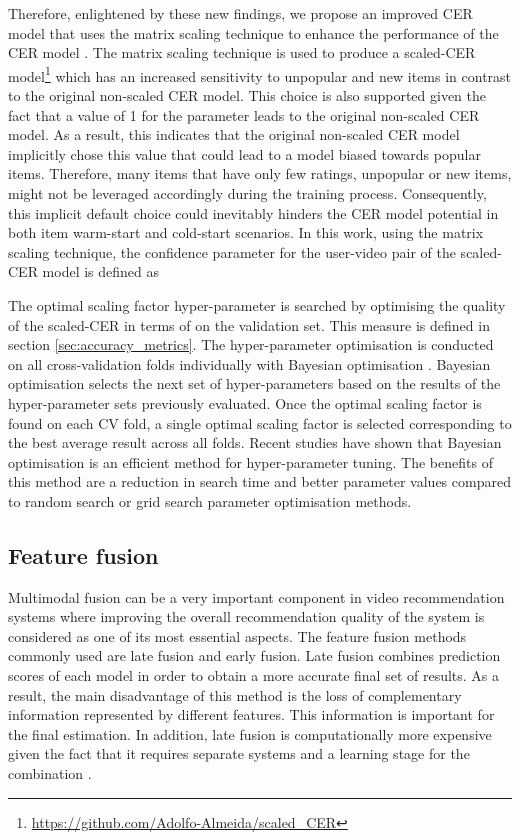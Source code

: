 \documentclass[review]{elsarticle}
\begin{document}
Therefore, enlightened by these new findings, we propose an improved CER model that uses the matrix scaling technique to enhance the performance of the CER model \citep{du2018personalized}. The matrix scaling technique is used to produce a scaled-CER model\footnote{\href{https://github.com/Adolfo-Almeida/scaled_CER}{https://github.com/Adolfo-Almeida/scaled\_CER}} which has an increased sensitivity to unpopular and new items in contrast to the original non-scaled CER model. This choice is also supported given the fact that a value of 1 for the parameter  leads to the original non-scaled CER model. As a result, this indicates that the original non-scaled CER model implicitly chose this value that could lead to a model biased towards popular items. Therefore, many items that have only few ratings, unpopular or new items, might not be leveraged accordingly during the training process. Consequently, this implicit default choice could inevitably hinders the CER model potential in both item warm-start and cold-start scenarios. In this work, using the matrix scaling technique, the confidence parameter  for the user-video pair  of the scaled-CER model is defined as 



The optimal scaling factor hyper-parameter  is searched by optimising the quality of the scaled-CER in terms of  on the validation set. This measure is defined in section \ref{sec:accuracy_metrics}. The hyper-parameter optimisation is conducted on all cross-validation folds individually with Bayesian optimisation \citep{deldjoo2019movie}. Bayesian optimisation selects the next set of hyper-parameters based on the results of the hyper-parameter sets previously evaluated. Once the optimal scaling factor is found on each CV fold, a single optimal scaling factor is selected corresponding to the best average  result across all folds. Recent studies \citep{deldjoo2019movie,dacrema2019we} have shown that Bayesian optimisation is an efficient method for hyper-parameter tuning. The benefits of this method are a reduction in search time and better parameter values compared to random search or grid search parameter optimisation methods. 








\subsection{Feature fusion}\label{sec:fusionAlgorithm}
Multimodal fusion can be a very important component in video recommendation systems where improving the overall recommendation quality of the system is considered as one of its most essential aspects. The feature fusion methods commonly used are late fusion and early fusion. Late fusion combines prediction scores of each model in order to obtain a more accurate final set of results. As a result, the main disadvantage of this method is the loss of complementary information represented by different features. This information is important for the final estimation. In addition, late fusion is computationally more expensive given the fact that it requires separate systems and a learning stage for the combination \citep{deldjoo2019movie}. 
\end{document}
